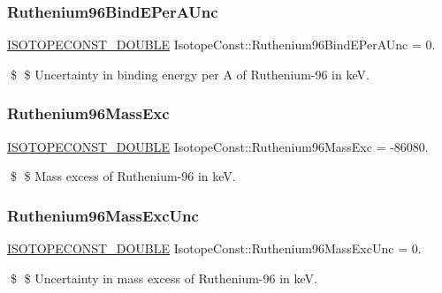 \subsubsection{\texorpdfstring{Ruthenium96\+Bind\+E\+Per\+A\+Unc}{Ruthenium96BindEPerAUnc}}
{\footnotesize\ttfamily \mbox{\hyperlink{group___isotope_const-_macros_ga8f45a7272ce02c0b4c65c44636ed719a}{I\+S\+O\+T\+O\+P\+E\+C\+O\+N\+S\+T\+\_\+\+D\+O\+U\+B\+LE}} Isotope\+Const\+::\+Ruthenium96\+Bind\+E\+Per\+A\+Unc = 0.}

\$ \$ Uncertainty in binding energy per A of Ruthenium-\/96 in keV. \mbox{\label{group___isotope_const-_ruthenium-_ru96_ga28a898d826f46d072228e6300341c76d}} 
\subsubsection{\texorpdfstring{Ruthenium96\+Mass\+Exc}{Ruthenium96MassExc}}
{\footnotesize\ttfamily \mbox{\hyperlink{group___isotope_const-_macros_ga8f45a7272ce02c0b4c65c44636ed719a}{I\+S\+O\+T\+O\+P\+E\+C\+O\+N\+S\+T\+\_\+\+D\+O\+U\+B\+LE}} Isotope\+Const\+::\+Ruthenium96\+Mass\+Exc = -\/86080.}

\$ \$ Mass excess of Ruthenium-\/96 in keV. \mbox{\label{group___isotope_const-_ruthenium-_ru96_ga24c8a4af4449d60a7e2aa68e999b5202}} 
\subsubsection{\texorpdfstring{Ruthenium96\+Mass\+Exc\+Unc}{Ruthenium96MassExcUnc}}
{\footnotesize\ttfamily \mbox{\hyperlink{group___isotope_const-_macros_ga8f45a7272ce02c0b4c65c44636ed719a}{I\+S\+O\+T\+O\+P\+E\+C\+O\+N\+S\+T\+\_\+\+D\+O\+U\+B\+LE}} Isotope\+Const\+::\+Ruthenium96\+Mass\+Exc\+Unc = 0.}

\$ \$ Uncertainty in mass excess of Ruthenium-\/96 in keV. \mbox{\label{group___isotope_const-_ruthenium-_ru96_ga615cb12ba0bc3cd988f0c8ddd8f42e9f}} 
